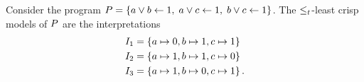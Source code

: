 \begin{example}
    Consider the program
    \mbox{$P = \left\{ a \lor b \gets{} 1 ,\; a \lor c \gets{} 1 ,\; b \lor c \gets{} 1\right\}$}.
    The $\leq_t$-least crisp models of $P$ are the interpretations
    \begin{align*}
        I_1 & =\left\{a\mapsto 0, b\mapsto1, c\mapsto1\right\}  \\
        I_2 & =\left\{a\mapsto 1, b\mapsto1, c\mapsto0\right\}  \\
        I_3 & =\left\{a\mapsto 1, b\mapsto0, c\mapsto1\right\}.
    \end{align*}
\end{example}